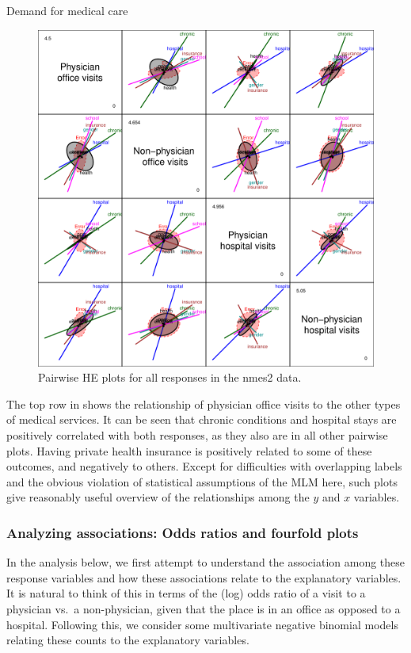 \documentclass[11pt]{book}\usepackage[]{graphicx}\usepackage[]{color}
\newenvironment{knitrout}{}{} %
\renewenvironment{knitrout}{\small\renewcommand{\baselinestretch}{.85}}{} %
\begin{document}
\begin{Example}[nmes4]{Demand for medical care}
\begin{knitrout}
\begin{figure}[!htbp]
\centerline{\includegraphics[width=.9\textwidth]{ch09/fig/nmes4-hepairs-1} }

\caption[Pairwise HE plots for all responses in the nmes2 data]{Pairwise HE plots for all responses in the nmes2 data.\label{fig:nmes4-hepairs}}
\end{figure}


\end{knitrout}
The top row in  shows the relationship of physician office visits to the other
types of medical services.  It can be seen that chronic conditions and hospital stays are positively
correlated with both responses, as they also are in all other pairwise plots.
Having private health insurance is positively related to some of these outcomes, and negatively
to others.  Except for difficulties with overlapping labels
and the obvious violation of statistical assumptions of the MLM here, such plots give
reasonably useful overview of the relationships among the $y$ and $x$ variables.

\subsubsection{Analyzing associations: Odds ratios and fourfold plots}
In the analysis below, we first attempt to understand the association among these response variables
and how these associations relate to the explanatory variables.  It is natural to think of this in terms
of the (log) odds ratio of a visit to a physician vs.\ a non-physician, given that the place
is in an office as opposed to a hospital.
Following this, we consider some multivariate negative binomial models relating these counts to the
explanatory variables.


\end{Example}
\end{document}
